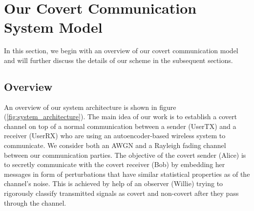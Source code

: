 \section{Our Covert Communication System Model}
\label{s:model}
In this section, we begin with an overview of our covert communication model and will further discuss the details of our scheme in the subsequent sections.
\subsection{Overview}
An overview of our system architecture is shown in figure (\ref{fig:system_architecture}). The main idea of our work is to establish a covert channel on top of a normal communication between a sender (UserTX) and a receiver (UserRX) who are using an autoencoder-based wireless system to communicate. We consider both an AWGN and a Rayleigh fading channel between our communication parties. The objective of the covert sender (Alice) is to secretly communicate with the covert receiver (Bob) by embedding her messages in form of perturbations that have similar statistical properties as of the channel's noise. This is achieved by help of an observer (Willie) trying to rigorously classify transmitted signals as covert and non-covert after they pass through the channel.\\
